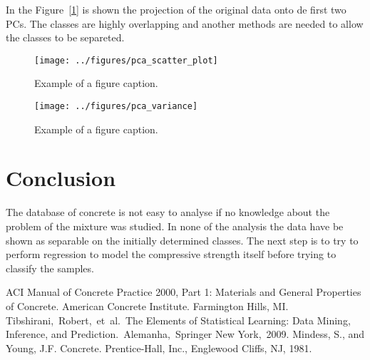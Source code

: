 \documentclass[conference]{IEEEtran}
\begin{document}
In the Figure~[\ref{pca_scatter_plot}] is shown the projection of the original data onto de first two PCs. The classes are highly overlapping and another methods are needed to allow the classes to be separeted.

\begin{figure}[htbp]
\centerline{\texttt{[image: ../figures/pca\_scatter\_plot]}}
\caption{Example of a figure caption.}
\label{pca_scatter_plot}
\end{figure}

\begin{figure}[htbp]
\centerline{\texttt{[image: ../figures/pca\_variance]}}
\caption{Example of a figure caption.}
\label{pca_variance}
\end{figure}

\section{Conclusion}\label{conclusions}

The database of concrete is not easy to analyse if no knowledge about the problem of the mixture was studied. In none of the analysis the data have be shown as separable on the initially determined classes. The next step is to try to perform regression to model the compressive strength itself before trying to classify the samples.

\begin{thebibliography}{00}
 ACI Manual of Concrete Practice 2000, Part 1: Materials and General Properties of Concrete.  American Concrete Institute.  Farmington Hills, MI.
 Tibshirani, Robert, et al. The Elements of  Statistical Learning:  Data Mining, Inference, and Prediction. Alemanha, Springer New York, 2009.
 Mindess, S., and Young, J.F. Concrete. Prentice-Hall, Inc., Englewood Cliffs, NJ, 1981.
\end{thebibliography}
\end{document}
